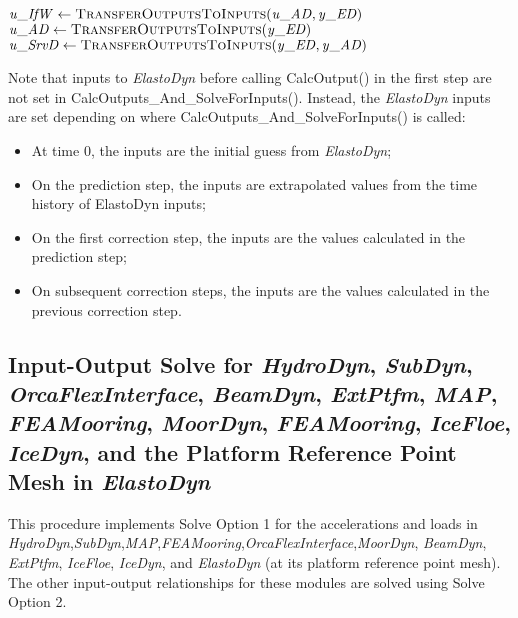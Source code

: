 \documentclass[10pt,letterpaper,oneside,notitlepage]{article}
\begin{document}
\begin{algorithmic}[1]
\State
\State {}
\State
   \State $\mathit{u\_IfW}  \gets \Call{TransferOutputsToInputs}{\mathit{u\_AD},\mathit{y\_ED}}$
   \State $\mathit{u\_AD}   \gets \Call{TransferOutputsToInputs}{\mathit{y\_ED}}$
   \State $\mathit{u\_SrvD} \gets \Call{TransferOutputsToInputs}{\mathit{y\_ED},\mathit{y\_AD}}$

\EndProcedure
\end{algorithmic}

Note that inputs to \emph{ElastoDyn} before calling CalcOutput() in the first step are not set in CalcOutputs\_And\_SolveForInputs(). 
Instead, the \emph{ElastoDyn} inputs are set depending on where CalcOutputs\_And\_SolveForInputs() is called:
\begin{itemize}[noitemsep] %
   \item At time 0, the inputs are the initial guess from \emph{ElastoDyn};
   \item On the prediction step, the inputs are extrapolated values from the time history of ElastoDyn inputs;
   \item On the first correction step, the inputs are the values calculated in the prediction step;
   \item On subsequent correction steps, the inputs are the values calculated in the previous correction step.
\end{itemize}


\subsection {Input-Output Solve for \textit{HydroDyn}, \textit{SubDyn}, \textit{OrcaFlexInterface}, \textit{BeamDyn}, \textit{ExtPtfm},  \textit{MAP}, \textit{FEAMooring}, \textit{MoorDyn},  
       \textit{FEAMooring}, \textit{IceFloe}, \textit{IceDyn}, and the Platform Reference Point Mesh in \textit{ElastoDyn}}

This procedure implements Solve Option 1 for the accelerations and loads in
\emph{HydroDyn},\emph{SubDyn},\emph{MAP},\emph{FEAMooring},\emph{OrcaFlexInterface},\emph{MoorDyn}, \emph{BeamDyn}, \emph{ExtPtfm}, \emph{IceFloe}, \emph{IceDyn}, and \emph{ElastoDyn} (at its platform reference point mesh). 
The other input-output relationships for these modules are solved using Solve Option 2.
\end{document}
